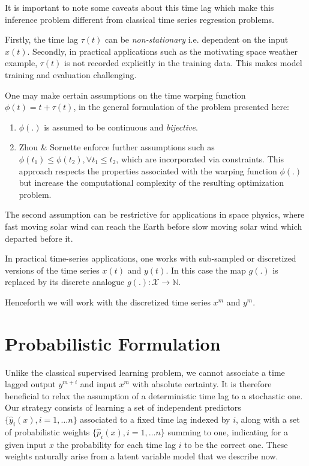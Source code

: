 \documentclass[envcountsect,runningheads]{llncs}
\theoremstyle{etoile}
\begin{document}
It is important to note some caveats about this time lag which make this inference problem 
different from classical time series regression problems.

Firstly, the time lag $\tau(t)$ can be \emph{non-stationary} i.e. dependent on the input $x(t)$. 
Secondly, in practical applications such as the motivating space weather example, $\tau(t)$ 
is not recorded explicitly in the training data. This makes model training and evaluation 
challenging.

One may make certain assumptions on the time warping function $\phi(t) = t + \tau(t)$, in the general 
formulation of the problem presented here: 

\begin{enumerate}
    \item $\phi(.)$ is assumed to be continuous and \emph{bijective}.
    \item Zhou \& Sornette \cite{ZHOU2006195} enforce further assumptions 
          such as $\phi(t_1) \leq \phi(t_2), \forall t_1 \leq t_2$, which 
          are incorporated via constraints. This approach respects the 
          properties associated with the warping function $\phi(.)$ but 
          increase the computational complexity of the resulting 
          optimization problem.
\end{enumerate}

The second assumption can be restrictive for applications in space physics, where fast moving 
solar wind can reach the Earth before slow moving solar wind which departed before it. 

In practical time-series applications, one works with sub-sampled or discretized versions of the time 
series $x(t)$ and $y(t)$. In this case the map $g(.)$ is replaced by its discrete analogue 
$g(.):\mathcal{X}  \rightarrow \mathbb{N}$. 

Henceforth we will work with the discretized time series $x^m$ and $y^m$.

\section{Probabilistic Formulation}\label{sec:probform}

Unlike the classical supervised learning problem, we cannot associate a time lagged output
$y^{m + i}$ and input $x^m$ with absolute certainty. It is therefore beneficial to relax 
the assumption of a deterministic time lag to a stochastic one. Our strategy consists of
learning a set of independent predictors $\{\hat y_i(x),i=1,\ldots n\}$ associated to a fixed time lag indexed by $i$, along with a set
of probabilistic weights $\{\hat p_i(x),i=1,\ldots n\}$ summing to one, indicating for a given input $x$ the probability for each time lag $i$
to be the correct one. These weights naturally arise from a latent variable model that we describe now.
\end{document}
